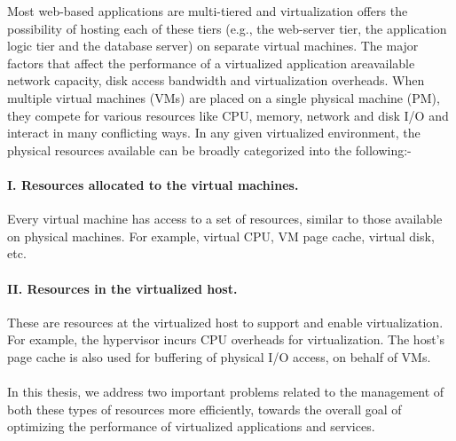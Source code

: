 Most web-based applications are multi-tiered and virtualization
offers the possibility of hosting each of these tiers (e.g., the 
web-server tier, the application logic tier and 
the database server) on separate virtual machines.
The major factors that affect the performance of a 
virtualized application are\textemdash{}available network capacity, disk access bandwidth
and virtualization overheads.
When multiple virtual machines (VMs) are placed on a single 
physical machine (PM),
they compete for various resources like CPU, memory, network and disk I/O
and interact in many conflicting ways. 
In any given virtualized environment, the physical resources available can 
be broadly categorized into the following:-

\paragraph{I. Resources allocated to the virtual machines.} 
Every virtual machine has access to a set of resources, similar
to those available on physical machines.
For example, virtual CPU, VM page cache, virtual disk, etc.

\paragraph{II. Resources in the virtualized host.} 
These are resources at the virtualized host to support and enable
virtualization.
For example, the hypervisor incurs CPU overheads
for virtualization. %
The host's page cache is also used for buffering of physical I/O access,
on behalf of VMs.
\\
\\
In this thesis, we address two
important problems related to the management of both
these types of resources more efficiently, towards the overall goal
of optimizing the performance of virtualized applications and services.

